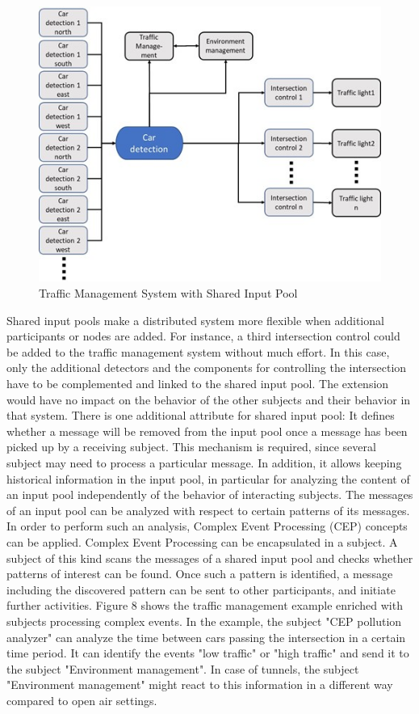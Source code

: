 \begin{figure}[htbp]
	\centering
	\includegraphics[width=0.9\linewidth]{Figures/Chapter5/figuresshared/SharedInputPoolExample.jpg}
	\caption[Traffic Management System with Shared Input Pool]{Traffic Management System with Shared Input Pool}
	\label{fig:SharedInputPooTraffic}
\end{figure}


Shared input pools make a distributed system more flexible when additional participants or nodes are added. For instance, a third intersection control could be added to the traffic management system without much effort. In this case, only the additional detectors and the components for controlling the intersection have to be complemented and linked to the shared input pool. The extension would have no impact on the behavior of the other subjects and their behavior in that system.
There is one additional attribute for shared input pool: It defines whether a message will be removed from the input pool once a message has been picked up by a receiving subject. This mechanism is required, since several subject may need to process a particular message. In addition, it allows keeping historical information in the input pool, in particular for analyzing the content of an input pool independently of the behavior of interacting subjects.
The messages of an input pool can be analyzed with respect to certain patterns of its messages. In order to perform such an analysis, Complex Event Processing (CEP) concepts can be applied. Complex Event Processing can be encapsulated in a subject. A subject of this kind scans the messages of a shared input pool and checks whether patterns of interest can be found. Once such a pattern is identified, a message including the discovered pattern can be sent to other participants, and initiate further activities. Figure 8 shows the traffic management example enriched with subjects processing complex events.
In the example, the subject "CEP pollution analyzer" can analyze the time between cars passing the intersection in a certain time period. It can identify the events "low traffic" or "high traffic" and send it to the subject "Environment management". In case of tunnels, the subject "Environment management" might react to this information in a different way compared to open air settings.


